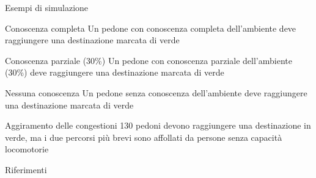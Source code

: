 \documentclass{beamer}
\begin{document}
\begin{frame}{Esempi di simulazione}
\begin{block}{Conoscenza completa}
Un pedone con conoscenza completa dell'ambiente deve raggiungere una destinazione marcata di verde
\end{block}
\begin{block}{Conoscenza parziale (30\%)}
Un pedone con conoscenza parziale dell'ambiente (30\%) deve raggiungere una destinazione marcata di verde
\end{block}
\begin{block}{Nessuna conoscenza}
Un pedone senza conoscenza dell'ambiente deve raggiungere una destinazione marcata di verde
\end{block}
\begin{block}{Aggiramento delle congestioni}
130 pedoni devono raggiungere una destinazione in verde, ma i due percorsi più brevi sono affollati da persone senza capacità locomotorie
\end{block}
\end{frame}{}

\begin{frame}{Riferimenti}
    \nocite{*}
    
    
\end{frame}
\end{document}
